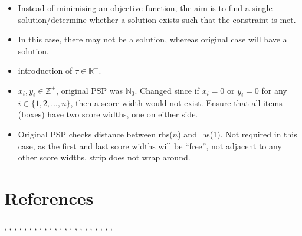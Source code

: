 \documentclass[oribibl]{llncs}
\begin{document}
\begin{itemize}
	\item Instead of minimising an objective function, the aim is to find a single solution/determine whether a solution exists such that the constraint is met.
	\item In this case, there may not be a solution, whereas original case will have a solution.
	\item introduction of $\tau \in \mathbb{R}^{+}$.
	\item $x_i, y_i \in \mathbb{Z}^{+}$, original PSP was $\mathbb{N}_{0}$. Changed since if $x_i = 0$ or $y_i = 0$ for any $i \in\{1, 2, ..., n\}$, then a score width would not exist. Ensure that all items (boxes) have two score widths, one on either side. 
	\item Original PSP checks distance between rhs($n$) and lhs(1). Not required in this case, as the first and last score widths will be ``free'', not adjacent to any other score widths, strip does not wrap around.
\end{itemize}














































\section{References}
\cite{becker2010}, \cite{becker2015}, \cite{coffman1978}, \cite{dosa2007}, \cite{eilon1971}, \cite{garey1979}, \cite{gilmore1961}, \cite{gilmore1963}, \cite{goulimis2004}, \cite{johnson1974worst}, \cite{johnson1974fast}, \cite{hung1978}, \cite{garey1972}, \cite{johnson1973}, \cite{karp1972}, \cite{korf2002}, \cite{lewis2009}, \cite{lewis2017}, \cite{lewis2011}, \cite{mahadev1994}, \cite{mahadev1995}, \cite{martello1990a}, \cite{martello1990b}















\end{document}
